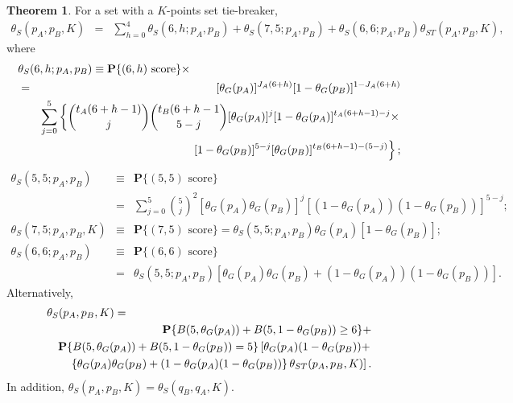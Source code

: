\documentclass[11pt]{article}
\theoremstyle{plain}
\theoremstyle{definition}
\newtheorem{theorem}{Theorem}[section]
\renewcommand{\Pr}{\mathbf{P}}
\begin{document}
\begin{theorem}
For a set with a $K$-points set tie-breaker,
%
\begin{eqnarray*}
    \theta_S(p_A,p_B,K) & = & \sum_{h=0}^4  \theta_S(6,h;p_A,p_B) + \theta_S(7,5;p_A,p_B) + \theta_S(6,6;p_A,p_B) \theta_{ST}(p_A,p_B,K),
\end{eqnarray*}
%
where
%
\begin{eqnarray*}
\lefteqn{ \theta_S(6,h;p_A,p_B)   \equiv    \Pr\{\mbox{$(6,h)$ score}\}  \times }  \\ & = &[\theta_G(p_A)]^{J_A(6+h)} [1 - \theta_G(p_B)]^{1-J_A(6+h)} \\ 
    && \sum_{j=0}^5 \left\{ {{t_A(6+h-1)} \choose j} {{t_B(6+h-1} \choose {5-j}}  [\theta_G(p_A)]^j [1 - \theta_G(p_A)]^{t_A(6+h-1) - j} \times \right. \\ && \left. [1 - \theta_G(p_B)]^{5-j} [\theta_G(p_B)]^{t_B(6+h-1) - (5-j)} \right\};
\end{eqnarray*}
%
\begin{eqnarray*}
\theta_S(5,5;p_A,p_B)  & \equiv & \Pr\{\mbox{$(5,5)$ score} \} \\ & = & \sum_{j=0}^5
    {5 \choose j}^2 [\theta_G(p_A) \theta_G(p_B)]^j 
    [(1-\theta_G(p_A))(1-\theta_G(p_B))]^{5-j}; \\
%
\theta_S(7,5;p_A,p_B,K) & \equiv &  \Pr\{\mbox{$(7,5)$ score} \} = 
 \theta_S(5,5;p_A,p_B) \theta_G(p_A) [1-\theta_G(p_B)]; \\
%
 \theta_S(6,6;p_A,p_B) & \equiv & \Pr\{\mbox{$(6,6)$ score} \} \\ & = &  \theta_S(5,5;p_A,p_B) \left[\theta_G(p_A) \theta_G(p_B) + (1-\theta_G(p_A))(1-\theta_G(p_B))\right].
\end{eqnarray*}
%
Alternatively,
%
\begin{eqnarray*}
\lefteqn{ \theta_S(p_A,p_B,K)   =  } \\ &&\Pr\{B(5,\theta_G(p_A)) + B(5,1-\theta_G(p_B)) \ge 6\} + \\ &&  \Pr\{B(5,\theta_G(p_A)) + B(5,1-\theta_G(p_B)) = 5\} \left[
    \theta_G(p_A)(1-\theta_G(p_B)) + \right. \\ && \left. \left\{\theta_G(p_A) \theta_G(p_B) + (1-
    \theta_G(p_A) (1 - \theta_G(p_B))\right\} \theta_{ST}(p_A,p_B,K) \right]. 
\end{eqnarray*}
%
In addition, $\theta_S(p_A,p_B,K) = \theta_S(q_B,q_A,K).$
%
\end{theorem}
\end{document}
